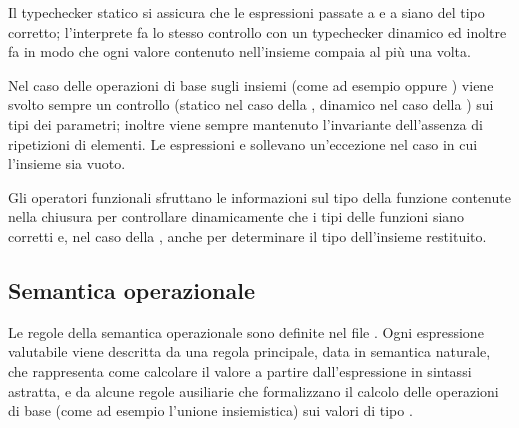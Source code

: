 Il typechecker statico si assicura che le espressioni passate a  e a  siano del tipo corretto; l'interprete fa lo stesso controllo con un typechecker dinamico ed inoltre fa in modo che ogni valore contenuto nell'insieme compaia al più una volta.

Nel caso delle operazioni di base sugli insiemi (come ad esempio  oppure ) viene svolto sempre un controllo (statico nel caso della , dinamico nel caso della ) sui tipi dei parametri; inoltre viene sempre mantenuto l'invariante dell'assenza di ripetizioni di elementi. Le espressioni  e  sollevano un'eccezione nel caso in cui l'insieme sia vuoto.

Gli operatori funzionali sfruttano le informazioni sul tipo della funzione contenute nella chiusura per controllare dinamicamente che i tipi delle funzioni siano corretti e, nel caso della , anche per determinare il tipo dell'insieme restituito.

\subsection*{Semantica operazionale}

Le regole della semantica operazionale sono definite nel file . Ogni espressione valutabile viene descritta da una regola principale, data in semantica naturale, che rappresenta come calcolare il valore a partire dall'espressione in sintassi astratta, e da alcune regole ausiliarie che formalizzano il calcolo delle operazioni di base (come ad esempio l'unione insiemistica) sui valori di tipo .